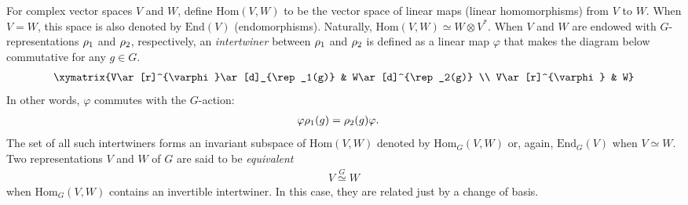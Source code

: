 
For complex vector spaces $V$ and $W$, define $\text{Hom}(V,W)$ to be the vector space of linear maps (linear homomorphisms) from $V$ to $W$. When $V = W$, this space is also denoted by $\text{End}(V)$ (endomorphisms). Naturally, $\text{Hom}(V,W) \simeq W \otimes V^*$. When $V$ and $W$ are endowed with $G$-representations $\rho_1$ and $\rho_2$, respectively, an \emph{intertwiner} between $\rho_1$ and $\rho_2$ is defined as a linear map $\varphi$ that makes the diagram below commutative for any $g\in G$.
\begin{align}
\xymatrix{V\ar[r]^{\varphi}\ar[d]_{\rep_1(g)} & W\ar[d]^{\rep_2(g)} \\
	V\ar[r]^{\varphi} & W}
\end{align}
In other words, $\varphi$ commutes with the $G$-action:
\begin{align}
\varphi \rho_1 (g) &= \rho_2 (g) \varphi.
\end{align}
The set of all such intertwiners forms an invariant subspace of $\text{Hom}(V,W)$ denoted by $\text{Hom}_G\allowbreak (V,W)$ or, again, $\text{End}_G (V)$ when $V \simeq W$. Two representations $V$ and $W$ of $G$ are said to be \emph{equivalent}
\begin{align}
V \stackrel{G}{\simeq} W
\end{align}
when $\text{Hom}_G (V,W)$ contains an invertible intertwiner. In this case, they are related just by a change of basis.

